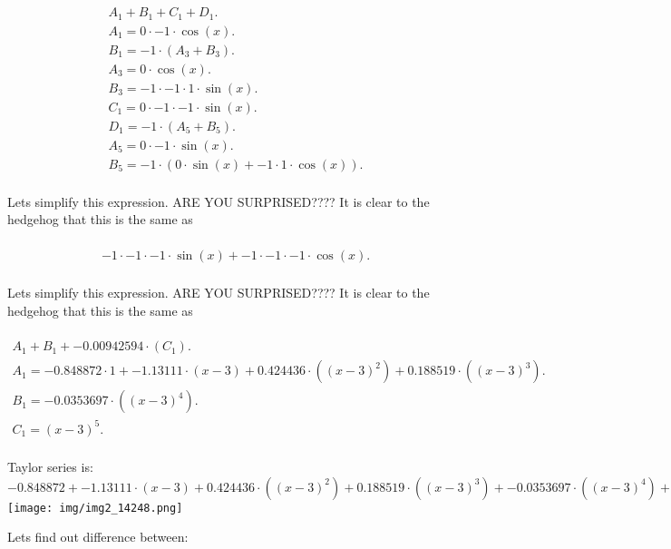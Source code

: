 \documentclass[12pt,a4paper]{extreport}
\begin{document}
\begin{multline}
\\
A_{1} + B_{1} + C_{1} + D_{1}.\\
A_{1} = 0 \cdot -1 \cdot \cos(x).\\
B_{1} = -1 \cdot (A_{3} + B_{3}).\\
A_{3} = 0 \cdot \cos(x).\\
B_{3} = -1 \cdot -1 \cdot 1 \cdot \sin(x).\\
C_{1} = 0 \cdot -1 \cdot -1 \cdot \sin(x).\\
D_{1} = -1 \cdot (A_{5} + B_{5}).\\
A_{5} = 0 \cdot -1 \cdot \sin(x).\\
B_{5} = -1 \cdot (0 \cdot \sin(x) + -1 \cdot 1 \cdot \cos(x)).\\
\end{multline}


Lets simplify this expression.
ARE YOU SURPRISED????\cite{Dashkov} It is clear to the hedgehog that this is the same as 

\begin{multline}
\\
-1 \cdot -1 \cdot -1 \cdot \sin(x) + -1 \cdot -1 \cdot -1 \cdot \cos(x).\\
\end{multline}


Lets simplify this expression.
ARE YOU SURPRISED????\cite{Dashkov} It is clear to the hedgehog that this is the same as 

\begin{multline}
\\
A_{1} + B_{1} + -0.00942594 \cdot (C_{1}).\\
A_{1} = -0.848872 \cdot 1 + -1.13111 \cdot (x - 3) + 0.424436 \cdot ((x - 3) ^ {2}) + 0.188519 \cdot ((x - 3) ^ {3}).\\
B_{1} = -0.0353697 \cdot ((x - 3) ^ {4}).\\
C_{1} = (x - 3) ^ {5}.\\
\end{multline}

Taylor series is: 
$-0.848872 + -1.13111 \cdot (x - 3) + 0.424436 \cdot ((x - 3) ^ {2}) + 0.188519 \cdot ((x - 3) ^ {3}) + -0.0353697 \cdot ((x - 3) ^ {4}) + -0.00942594 \cdot ((x - 3) ^ {5})+ o((x - 3)^{5}).$\\

\texttt{[image: img/img2\_14248.png]}

Lets find out difference between:
\end{document}
